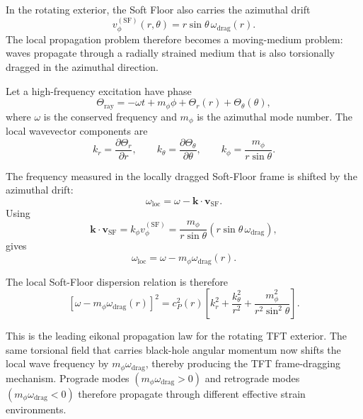 In the rotating exterior, the Soft Floor also carries the azimuthal drift
\begin{equation}
    v_{\phi}^{(\mathrm{SF})}(r,\theta)
    =
    r\sin\theta\,\omega_{\mathrm{drag}}(r).
\end{equation}
The local propagation problem therefore becomes a moving-medium problem: waves propagate through a radially strained medium that is also torsionally dragged in the azimuthal direction.

Let a high-frequency excitation have phase
\begin{equation}
    \Theta_{\mathrm{ray}}
    =
    -\omega t
    +
    m_{\phi}\phi
    +
    \Theta_r(r)
    +
    \Theta_{\theta}(\theta),
\end{equation}
where \(\omega\) is the conserved frequency and \(m_{\phi}\) is the azimuthal mode number. The local wavevector components are
\begin{equation}
    k_r
    =
    \frac{\partial \Theta_r}{\partial r},
    \qquad
    k_{\theta}
    =
    \frac{\partial \Theta_{\theta}}{\partial \theta},
    \qquad
    k_{\phi}
    =
    \frac{m_{\phi}}{r\sin\theta} .
\end{equation}

The frequency measured in the locally dragged Soft-Floor frame is shifted by the azimuthal drift:
\begin{equation}
    \omega_{\mathrm{loc}}
    =
    \omega
    -
    \mathbf{k}\cdot\mathbf{v}_{\mathrm{SF}} .
\end{equation}
Using
\begin{equation}
    \mathbf{k}\cdot\mathbf{v}_{\mathrm{SF}}
    =
    k_{\phi}v_{\phi}^{(\mathrm{SF})}
    =
    \frac{m_{\phi}}{r\sin\theta}
    \left(r\sin\theta\,\omega_{\mathrm{drag}}\right),
\end{equation}
gives
\begin{equation}
    \omega_{\mathrm{loc}}
    =
    \omega
    -
    m_{\phi}\omega_{\mathrm{drag}}(r).
\end{equation}

The local Soft-Floor dispersion relation is therefore
\begin{equation}
    \left[
    \omega
    -
    m_{\phi}\omega_{\mathrm{drag}}(r)
    \right]^2
    =
    c_P^2(r)
    \left[
    k_r^2
    +
    \frac{k_{\theta}^2}{r^2}
    +
    \frac{m_{\phi}^2}{r^2\sin^2\theta}
    \right].
\end{equation}

This is the leading eikonal propagation law for the rotating TFT exterior. The same torsional field that carries black-hole angular momentum now shifts the local wave frequency by \(m_{\phi}\omega_{\mathrm{drag}}\), thereby producing the TFT frame-dragging mechanism. Prograde modes \((m_{\phi}\omega_{\mathrm{drag}}>0)\) and retrograde modes \((m_{\phi}\omega_{\mathrm{drag}}<0)\) therefore propagate through different effective strain environments.

